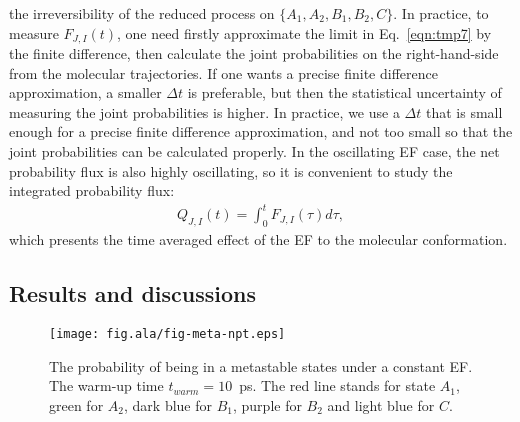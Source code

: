 \documentclass[a4paper,preprint,unsortedaddress,onecolumn]{revtex4-1}
\begin{document}
the irreversibility of the reduced process on
$\{A_1, A_2, B_1, B_2, C\}$.
In practice, to measure $ F_{J,I}(t)$, one need firstly approximate the limit
in Eq.~\eqref{eqn:tmp7} by the finite difference,
then calculate the joint probabilities on
the right-hand-side from the molecular trajectories.
If one wants a precise finite difference approximation, a smaller $\Delta t$ is
preferable,
but then the statistical uncertainty of measuring the joint probabilities
is higher. In practice,
we use a $\Delta t$ that is small enough for a precise finite difference approximation,
and not too small so that the joint probabilities can be calculated properly.
In the oscillating EF case, the net probability flux is also highly oscillating,
so it is convenient to study the integrated probability flux:
\begin{align}
  Q_{J,I} (t) = \int_0^t F_{J,I}(\tau)d \tau,
\end{align}
which presents the time averaged effect of the EF to the molecular conformation.





\subsection{Results and discussions}


\begin{figure}
  \centering
  \texttt{[image: fig.ala/fig-meta-npt.eps]}
  \caption{The probability of being in a metastable states under a constant EF.
    The warm-up time $t_{warm} = 10$~ps. The red line stands for state $A_1$,
    green for $A_2$, dark blue for $B_1$, purple for $B_2$ and light blue
    for $C$.
  }
  \label{fig:tmp5}
\end{figure}
\end{document}
